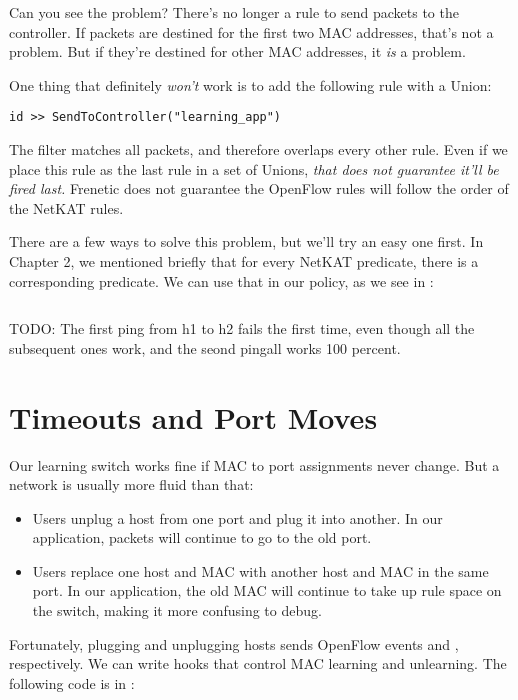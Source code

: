Can you see the problem?  There's no longer a rule to send packets to the controller.  If packets
are destined for the first two MAC addresses, that's not a problem.  But if they're destined for
other MAC addresses, it \emph{is} a problem.

One thing that definitely \emph{won't} work is to add the following rule with a Union:

\begin{verbatim}
id >> SendToController("learning_app")
\end{verbatim}

The  filter matches all packets, and therefore overlaps every other rule.  Even if we place this
rule as the last rule in a set of Unions, \emph{that does not guarantee it'll be fired last.}  Frenetic 
does not guarantee the OpenFlow rules will follow the order of the NetKAT rules.     

There are a few ways to solve this problem, but we'll try an easy one first.  
In Chapter 2, we mentioned briefly that for every  NetKAT predicate, there is a corresponding
 predicate.  We can use that in our policy, as we see in :

\inputminted[firstline=30,lastline=36]{python}{code/l2_learning_switch/learning3.py}

TODO: The first ping from h1 to h2 fails the first time, even though all the subsequent ones work, and 
the seond pingall works 100 percent.  

\section{Timeouts and Port Moves}
\label{l2_learning_switch:timeouts}

Our learning switch works fine if MAC to port assignments never change.  But a network is usually
more fluid than that:

\begin{itemize}
\item Users unplug a host from one port and plug it into another.  In our application, packets will
continue to go to the old port.
\item Users replace one host and MAC with another host and MAC in the same port.  In our application, the
old MAC will continue to take up rule space on the switch, making it more confusing to debug. 
\end{itemize}

Fortunately, plugging and unplugging hosts sends OpenFlow events  and ,
respectively.  We can write hooks that control MAC learning and unlearning.  The following
code is in :

